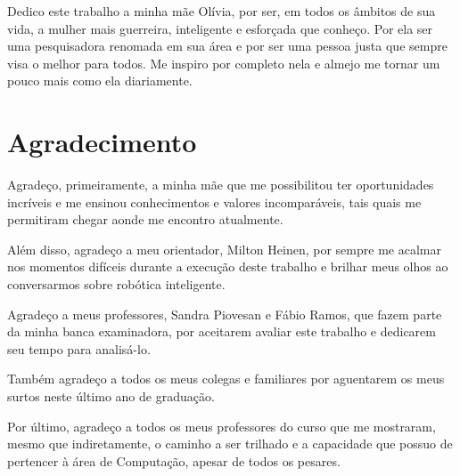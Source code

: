 



\begin{dedicatoria}
Dedico este trabalho a minha mãe Olívia, por ser, em todos os âmbitos de sua vida, a mulher mais guerreira, inteligente e esforçada que conheço. Por ela ser uma pesquisadora renomada em sua área e por ser uma pessoa justa que sempre visa o melhor para todos. Me inspiro por completo nela e almejo me tornar um pouco mais como ela diariamente.
\end{dedicatoria}


\chapter*{Agradecimento}
Agradeço, primeiramente, a minha mãe que me possibilitou ter oportunidades incríveis e me ensinou conhecimentos e valores incomparáveis, tais quais me permitiram chegar aonde me encontro atualmente. 

Além disso, agradeço a meu orientador, Milton Heinen, por sempre me acalmar nos momentos difíceis durante a execução deste trabalho e brilhar meus olhos ao conversarmos sobre robótica inteligente.

Agradeço a meus professores, Sandra Piovesan e Fábio Ramos, que fazem parte da minha banca examinadora, por aceitarem avaliar este trabalho e dedicarem seu tempo para analisá-lo. 

Também agradeço a todos os meus colegas e familiares por aguentarem os meus surtos neste último ano de graduação. 

Por último, agradeço a todos os meus professores do curso que me mostraram, mesmo que indiretamente, o caminho a ser trilhado e a capacidade que possuo de pertencer à área de Computação, apesar de todos os pesares.
